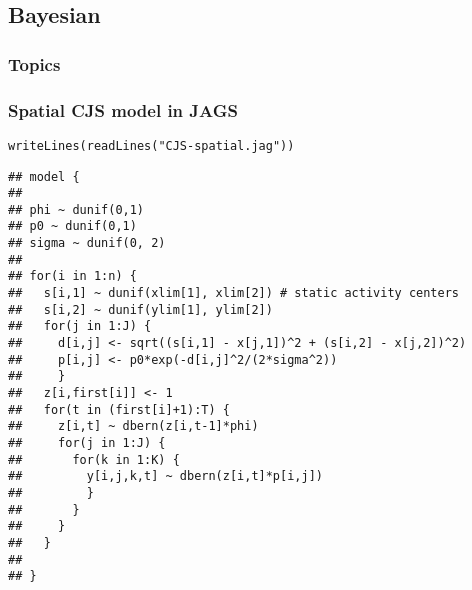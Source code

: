 \documentclass[color=usenames,dvipsnames]{beamer}\usepackage[]{graphicx}\usepackage[]{color}
\makeatletter
\newcommand{\hlstr}[1]{\textcolor[rgb]{0.749,0.012,0.012}{#1}}%
\newcommand{\hlstd}[1]{\textcolor[rgb]{0,0,0}{#1}}%
\newcommand{\hlkwd}[1]{\textcolor[rgb]{0.004,0.004,0.506}{#1}}%
\newenvironment{kframe}{%
 \def\at@end@of@kframe{}%
 \ifinner\ifhmode%
  \def\at@end@of@kframe{\end{minipage}}%
  \begin{minipage}{\columnwidth}%
 \fi\fi%
 \def\FrameCommand##1{\hskip\@totalleftmargin \hskip-\fboxsep
 \colorbox{shadecolor}{##1}\hskip-\fboxsep
     \hskip-\linewidth \hskip-\@totalleftmargin \hskip\columnwidth}%
 \MakeFramed {\advance\hsize-\width
   \@totalleftmargin\z@ \linewidth\hsize
   \@setminipage}}%
 {\par\unskip\endMakeFramed%
 \at@end@of@kframe}
\newenvironment{knitrout}{}{} %
\makeatother
\begin{document}
\subsection{Bayesian}



\begin{frame}[plain]
  \frametitle{Topics}
  \Large
\end{frame}




\begin{frame}[fragile]
  \frametitle{Spatial CJS model in JAGS}
\begin{knitrout}\tiny
{}\color{fgcolor}\begin{kframe}
\begin{alltt}
\hlkwd{writeLines}\hlstd{(}\hlkwd{readLines}\hlstd{(}\hlstr{"CJS-spatial.jag"}\hlstd{))}
\end{alltt}
\begin{verbatim}
## model {
## 
## phi ~ dunif(0,1)
## p0 ~ dunif(0,1)
## sigma ~ dunif(0, 2)
## 
## for(i in 1:n) {
##   s[i,1] ~ dunif(xlim[1], xlim[2]) # static activity centers
##   s[i,2] ~ dunif(ylim[1], ylim[2])
##   for(j in 1:J) {
##     d[i,j] <- sqrt((s[i,1] - x[j,1])^2 + (s[i,2] - x[j,2])^2)
##     p[i,j] <- p0*exp(-d[i,j]^2/(2*sigma^2))
##     }
##   z[i,first[i]] <- 1
##   for(t in (first[i]+1):T) {
##     z[i,t] ~ dbern(z[i,t-1]*phi)
##     for(j in 1:J) {
##       for(k in 1:K) {
##         y[i,j,k,t] ~ dbern(z[i,t]*p[i,j])
##         }
##       }
##     }
##   }
## 
## }
\end{verbatim}
\end{kframe}
\end{knitrout}
\end{frame}
\end{document}
